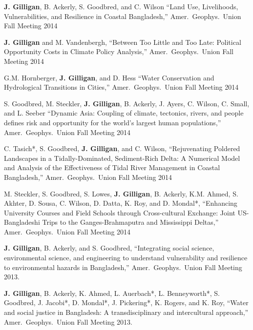 %
%
    \item \textbf{J. Gilligan}, B. Ackerly, S. Goodbred, and C. Wilson
    \enquote{Land Use, Livelihoods, Vulnerabilities, and Resilience in Coastal Bangladesh,}
    Amer.\ Geophys.\ Union Fall Meeting 2014

    \item \textbf{J. Gilligan} and M. Vandenbergh,
    \enquote{Between Too Little and Too Late: Political Opportunity Costs in Climate Policy Analysis,}
    Amer.\ Geophys.\ Union Fall Meeting 2014

    \item G.M. Hornberger, \textbf{J. Gilligan}, and D. Hess
    \enquote{Water Conservation and Hydrological Transitions in Cities,}
    Amer.\ Geophys.\ Union Fall Meeting 2014

    \item S. Goodbred, M. Steckler, \textbf{J. Gilligan}, B. Ackerly, J. Ayers, C. Wilson, C. Small, and L. Seeber
    \enquote{Dynamic Asia: Coupling of climate, tectonics, rivers, and people defines risk and opportunity for the world’s largest human populations,}
    Amer.\ Geophys.\ Union Fall Meeting 2014

    \item C. Tasich*, S. Goodbred, \textbf{J. Gilligan}, and C. Wilson,
    \enquote{Rejuvenating Poldered Landscapes in a Tidally-Dominated, Sediment-Rich Delta: A Numerical Model and Analysis of the Effectiveness of Tidal River Management in Coastal Bangladesh,}
    Amer.\ Geophys.\ Union Fall Meeting 2014

    \item M. Steckler, S. Goodbred, S. Lowes, \textbf{J. Gilligan}, B. Ackerly, K.M. Ahmed, S. Akhter, D. Sousa, C. Wilson, D. Datta, K. Roy, and D. Mondal*,
    \enquote{Enhancing University Courses and Field Schools through Cross-cultural Exchange: Joint US-Bangladeshi Trips to the Ganges-Brahmaputra and Mississippi Deltas,}
    Amer.\ Geophys.\ Union Fall Meeting 2014

    \item \textbf{J. Gilligan}, B. Ackerly, and S. Goodbred,
    \enquote{Integrating social science, environmental science, and engineering to understand vulnerability and resilience to environmental hazards in Bangladesh,}
    Amer.\ Geophys.\ Union Fall Meeting 2013.

    \item \textbf{J. Gilligan}, B. Ackerly, K. Ahmed, L. Auerbach*, L. Benneyworth*, S. Goodbred, J. Jacobi*,  D. Mondal*, J. Pickering*, K. Rogers, and K. Roy,
    \enquote{Water and social justice in Bangladesh: A transdisciplinary and intercultural approach,}
    Amer.\ Geophys.\ Union Fall Meeting 2013.


